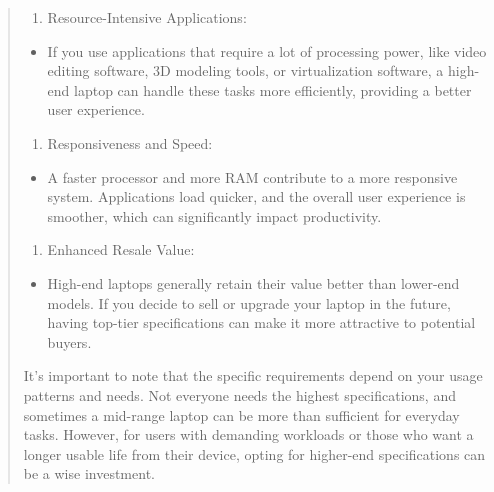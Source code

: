 \documentclass[14pt,letterpaper,twoside]{extreport}
\renewenvironment{leftbar}[1][\hsize]
{%
    \def\FrameCommand{%
        {\color{gray!25}\vrule width 10pt}%
        \hspace{0pt}
        \fboxsep=\FrameSep\colorbox{gray!5}%
    }%
    \MakeFramed{\hsize#1\advance\hsize-\width\FrameRestore}%
}
{\endMakeFramed}
\begin{document}
\begin{leftbar}
\begin{quote}
\begin{enumerate}[leftmargin=*]
			\item
			      Resource-Intensive Applications:
		\end{enumerate}

		\begin{itemize}

			\item
			      If you use applications that require a lot of processing power, like video editing software, 3D modeling tools, or virtualization software, a high-end laptop can handle these tasks more efficiently, providing a better user experience.
		\end{itemize}

		\begin{enumerate}[leftmargin=*]
			\def\labelenumi{\arabic{enumi}.}
			\setcounter{enumi}{6}

			\item
			      Responsiveness and Speed:
		\end{enumerate}

		\begin{itemize}

			\item
			      A faster processor and more RAM contribute to a more responsive system. Applications load quicker, and the overall user experience is smoother, which can significantly impact productivity.
		\end{itemize}

		\begin{enumerate}[leftmargin=*]
			\def\labelenumi{\arabic{enumi}.}
			\setcounter{enumi}{7}

			\item
			      Enhanced Resale Value:
		\end{enumerate}

		\begin{itemize}

			\item
			      High-end laptops generally retain their value better than lower-end models. If you decide to sell or upgrade your laptop in the future, having top-tier specifications can make it more attractive to potential buyers.
		\end{itemize}

		It's important to note that the specific requirements depend on your usage patterns and needs. Not everyone needs the highest specifications, and sometimes a mid-range laptop can be more than sufficient for everyday tasks. However, for users with demanding workloads or those who want a longer usable life from their device, opting for higher-end specifications can be a wise investment.
	\end{quote}\end{leftbar}
\end{document}
